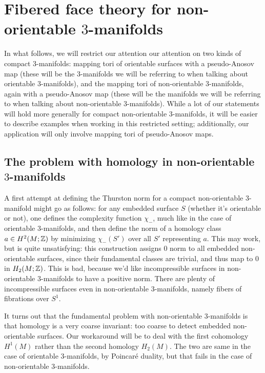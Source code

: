 \section{Fibered face theory for non-orientable $3$-manifolds}
\label{sec:fibered-face-theory}

In what follows, we will restrict our attention our attention on two kinds of compact $3$-manifolds: mapping
tori of orientable surfaces with a pseudo-Anosov map (these will be the $3$-manifolds we will be referring to
when talking about orientable $3$-manifolds), and the mapping tori of non-orientable $3$-manifolds, again with
a pseudo-Anosov map (these will be the manifolds we will be referring to when talking about non-orientable
$3$-manifolds). While a lot of our statements will hold more generally for compact non-orientable
$3$-manifolds, it will be easier to describe examples when working in this restricted setting; additionally,
our application will only involve mapping tori of pseudo-Anosov maps.

\subsection{The problem with homology in non-orientable $3$-manifolds}
\label{sec:probl-with-homol}

A first attempt at defining the Thurston norm for a compact non-orientable $3$-manifold might go as follows:
for any embedded surface $S$ (whether it's orientable or not), one defines the complexity function $\chi_-$,
much like in the case of orientable $3$-manifolds, and then define the norm of a homology class
$a \in H^2(M; \mathbb{Z})$ by minimizing $\chi_-(S')$ over all $S'$ representing $a$. This may work, but is quite
unsatisfying: this construction assigns $0$ norm to all embedded non-orientable surfaces, since their
fundamental classes are trivial, and thus map to $0$ in $H_2(M; \mathbb{Z})$. This is bad, because we'd like
incompressible surfaces in non-orientable $3$-manifolds to have a positive norm. There are plenty of
incompressible surfaces even in non-orientable $3$-manifolds, namely fibers of fibrations over $S^1$.

It turns out that the fundamental problem with non-orientable $3$-manifolds is that homology is a
very coarse invariant: too coarse to detect embedded non-orientable surfaces. Our workaround will
be to deal with the first cohomology $H^1(M)$ rather than the second homology $H_2(M)$. The two are
same in the case of orientable $3$-manifolds, by Poincar\'e duality, but that fails in the case
of non-orientable $3$-manifolds.

